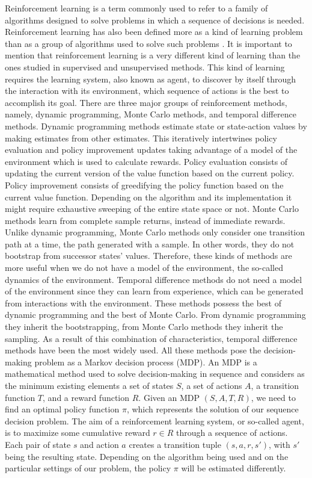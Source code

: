 \label{sec:1}
Reinforcement learning is a term commonly used to refer to a family of algorithms designed to solve problems in which a sequence of decisions is needed. Reinforcement learning has also been defined more as a kind of learning problem than as a group of algorithms used to solve such problems . It is important to mention that reinforcement learning is a very different kind of learning than the ones studied in supervised and unsupervised methods. This kind of learning requires the learning system, also known as agent, to discover by itself through the interaction with its environment, which sequence of actions is the best to accomplish its goal. 
There are three major groups of reinforcement methods, namely, dynamic programming, Monte Carlo methods, and temporal difference methods. Dynamic programming methods estimate state or state-action values by making estimates from other estimates. This iteratively  intertwines policy evaluation and policy improvement updates taking advantage of a model of the environment which is used to calculate rewards. Policy evaluation consists of updating the current version of the value function based on the current policy. Policy improvement consists of greedifying the policy function based on the current value function. Depending on the algorithm and its implementation it might require exhaustive sweeping of the entire state space or not. Monte Carlo methods learn from complete sample returns, instead of immediate rewards. Unlike dynamic programming, Monte Carlo methods only consider one transition path at a time, the path generated with a sample. In other words, they do not bootstrap from successor states’ values. Therefore, these kinds of methods are more useful when we do not have a model of the environment, the so-called dynamics of the environment. Temporal difference methods do not need a model of the environment since they can learn from experience, which can be generated from interactions with the environment. These methods possess the best of dynamic programming and the best of Monte Carlo. From dynamic programming they inherit the bootstrapping, from Monte Carlo methods they inherit the sampling. As a result of this combination of characteristics, temporal difference methods have been the most widely used. All these methods pose the decision-making problem as a Markov decision process (MDP). An MDP is a mathematical method used to solve decision-making in sequence and considers as the minimum existing elements a set of states $S$, a set of actions $A$, a transition function $T$, and a reward function $R$. Given an MDP $(S, A, T, R)$, we need to find an optimal policy function $\pi$, which represents the solution of our sequence decision problem. The aim of a reinforcement learning system, or so-called agent, is to maximize some cumulative reward  $r \in R$ through a sequence of actions. Each pair of state $s$ and action $a$ creates a transition tuple $(s,a,r,s')$, with $s'$ being the resulting state. Depending on the algorithm being used and on the particular settings of our problem, the policy $\pi$ will be estimated differently.
